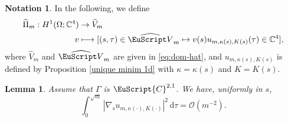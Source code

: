 \documentclass[JEP,XML,SOM,Unicode]{cedram}
\let\mathcal \EuScript
\newcommand\mto{\mathchoice{\longmapsto}{\mapsto}{\mapsto}{\mapsto}}
\newcommand{\scrO}{\mathscr{O}}
\newcommand{\cC}{\mathcal{C}}
\theoremstyle{plain}
\newtheorem{lemma}[theorem]{Lemma}
\theoremstyle{definition}
\newtheorem{notation}[theorem]{Notation}
\newcommand{\CC}{\mathbb{C}}
\newcommand{\dx}{\mathrm{\,d}}
\begin{document}
\begin{notation}\label{not.vkK}
In the following, we define
\begin{align*}
\widehat{\Pi}_m : H^{1}(\Omega; \CC^4) &\to \widehat{V}_m
\\
v &\mto [(s,\tau)\in \widehat{\mathcal V}_{m}\mapsto v(s)u_{m,\kappa(s),K(s)}(\tau)\in \CC^4],
\end{align*}
where $\widehat{V}_m$ and $\widehat{\mathcal V}_{m}$ are given in \eqref{eq:dom-hat}, and $u_{m,\kappa(s),K(s)}$ is defined by Proposition \ref{unique minim 1d} with $\kappa = \kappa(s) $ and $K = K(s)$.
\end{notation}
\begin{lemma}\label{lem.deriv-u}
Assume that $\Gamma$ is $\cC^{2,1}$.
We have, uniformly in $s$,
\[\int_0^{\sqrt{m}}|\nabla_s u_{m,\kappa(\cdot),K(\cdot)}|^2\dx\tau=\scrO(m^{-2}).\]
\end{lemma}
\end{document}
